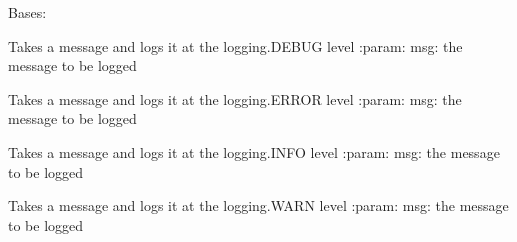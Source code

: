 \documentclass[letterpaper,10pt,english]{sphinxmanual}
\begin{document}
\begin{fulllineitems}
\label{\detokenize{pydash_logger.logger:pydash_logger.logger.Logger}}
Bases: 

\begin{fulllineitems}
\label{\detokenize{pydash_logger.logger:pydash_logger.logger.Logger.debug}}
Takes a message and logs it at the logging.DEBUG level
:param: msg: the message to be logged

\end{fulllineitems}


\begin{fulllineitems}
\label{\detokenize{pydash_logger.logger:pydash_logger.logger.Logger.error}}
Takes a message and logs it at the logging.ERROR level
:param: msg: the message to be logged

\end{fulllineitems}


\begin{fulllineitems}
\label{\detokenize{pydash_logger.logger:pydash_logger.logger.Logger.info}}
Takes a message and logs it at the logging.INFO level
:param: msg: the message to be logged

\end{fulllineitems}


\begin{fulllineitems}
\label{\detokenize{pydash_logger.logger:pydash_logger.logger.Logger.warning}}
Takes a message and logs it at the logging.WARN level
:param: msg: the message to be logged

\end{fulllineitems}


\end{fulllineitems}
\end{document}
